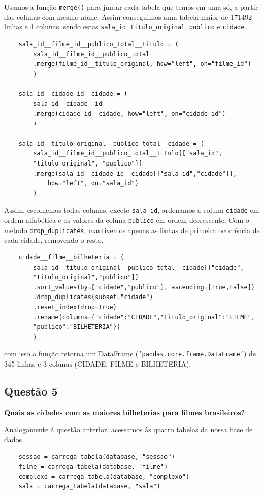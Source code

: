 \documentclass[12pt, a4paper]{article}
\begin{document}
Usamos a função \texttt{merge()} para juntar cada tabela que temos em uma só, a partir das colunas com mesmo nome. Assim conseguimos uma tabela maior de 171492 linhas e 4 colunas, sendo estas \texttt{sala\_id}, \texttt{titulo\_original}, \texttt{publico} e \texttt{cidade}.
\begin{verbatim}
    sala_id__filme_id__publico_total__titulo = (
        sala_id__filme_id__publico_total
        .merge(filme_id__titulo_original, how="left", on="filme_id")
        )
    
    sala_id__cidade_id__cidade = (
        sala_id__cidade__id
        .merge(cidade_id__cidade, how="left", on="cidade_id")
        )

    sala_id__titulo_original__publico_total__cidade = (
        sala_id__filme_id__publico_total__titulo[["sala_id",
        "titulo_original", "publico"]]
        .merge(sala_id__cidade_id__cidade[["sala_id","cidade"]], 
            how="left", on="sala_id")
        )
\end{verbatim}

Assim, escolhemos todas colunas, exceto \texttt{sala\_id}, ordenamos a coluna \texttt{cidade} em ordem alfabética e os valores da coluna \texttt{publico} em ordem decrescente. Com o método \texttt{drop\_duplicates}, mantivemos apenas as linhas de primeira ocorrência de cada cidade, removendo o resto.
\begin{verbatim}
    cidade__filme__bilheteria = (
        sala_id__titulo_original__publico_total__cidade[["cidade",
        "titulo_original","publico"]]
        .sort_values(by=["cidade","publico"], ascending=[True,False])
        .drop_duplicates(subset="cidade") 
        .reset_index(drop=True)
        .rename(columns={"cidade":"CIDADE","titulo_original":"FILME",
        "publico":"BILHETERIA"})
        )
\end{verbatim}

com isso a função retorna um DataFrame (\texttt{`pandas.core.frame.DataFrame'}) de 345 linhas e 3 colunas (CIDADE, FILME e BILHETERIA).

\subsection{Questão 5}
\textbf{Quais as cidades com as maiores bilheterias para filmes brasileiros?}

Analogamente à questão anterior, acessamos às quatro tabelas da nossa base de dados 
\begin{verbatim}
    sessao = carrega_tabela(database, "sessao")
    filme = carrega_tabela(database, "filme")
    complexo = carrega_tabela(database, "complexo")
    sala = carrega_tabela(database, "sala")
\end{verbatim}
\end{document}
